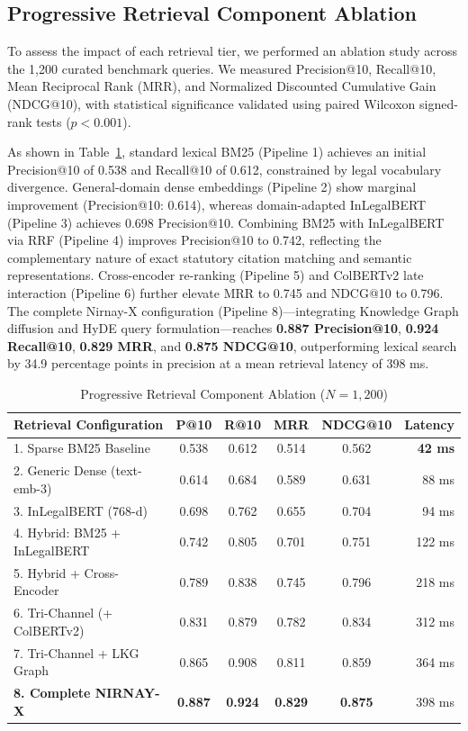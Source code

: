 \documentclass[conference]{IEEEtran}
\begin{document}
\subsection{Progressive Retrieval Component Ablation}
To assess the impact of each retrieval tier, we performed an ablation study across the 1,200 curated benchmark queries. We measured Precision@10, Recall@10, Mean Reciprocal Rank (MRR), and Normalized Discounted Cumulative Gain (NDCG@10), with statistical significance validated using paired Wilcoxon signed-rank tests ($p < 0.001$).

As shown in Table~\ref{tab:retrieval_ablation}, standard lexical BM25 (Pipeline 1) achieves an initial Precision@10 of 0.538 and Recall@10 of 0.612, constrained by legal vocabulary divergence. General-domain dense embeddings (Pipeline 2) show marginal improvement (Precision@10: 0.614), whereas domain-adapted InLegalBERT (Pipeline 3) achieves 0.698 Precision@10. Combining BM25 with InLegalBERT via RRF (Pipeline 4) improves Precision@10 to 0.742, reflecting the complementary nature of exact statutory citation matching and semantic representations. Cross-encoder re-ranking (Pipeline 5) and ColBERTv2 late interaction (Pipeline 6) further elevate MRR to 0.745 and NDCG@10 to 0.796. The complete Nirnay-X configuration (Pipeline 8)---integrating Knowledge Graph diffusion and HyDE query formulation---reaches \textbf{0.887 Precision@10}, \textbf{0.924 Recall@10}, \textbf{0.829 MRR}, and \textbf{0.875 NDCG@10}, outperforming lexical search by 34.9 percentage points in precision at a mean retrieval latency of 398 ms.

\begin{table}[!t]
\caption{Progressive Retrieval Component Ablation ($N=1,200$)}
\label{tab:retrieval_ablation}
\centering
\small
\begin{tabularx}{\columnwidth}{lccccr}
\toprule
\textbf{Retrieval Configuration} & \textbf{P@10} & \textbf{R@10} & \textbf{MRR} & \textbf{NDCG@10} & \textbf{Latency} \\
\midrule
1. Sparse BM25 Baseline & 0.538 & 0.612 & 0.514 & 0.562 & \textbf{42 ms} \\
2. Generic Dense (text-emb-3) & 0.614 & 0.684 & 0.589 & 0.631 & 88 ms \\
3. InLegalBERT (768-d) & 0.698 & 0.762 & 0.655 & 0.704 & 94 ms \\
4. Hybrid: BM25 + InLegalBERT & 0.742 & 0.805 & 0.701 & 0.751 & 122 ms \\
5. Hybrid + Cross-Encoder & 0.789 & 0.838 & 0.745 & 0.796 & 218 ms \\
6. Tri-Channel (+ ColBERTv2) & 0.831 & 0.879 & 0.782 & 0.834 & 312 ms \\
7. Tri-Channel + LKG Graph & 0.865 & 0.908 & 0.811 & 0.859 & 364 ms \\
\midrule
\textbf{8. Complete NIRNAY-X} & \textbf{0.887} & \textbf{0.924} & \textbf{0.829} & \textbf{0.875} & 398 ms \\
\bottomrule
\end{tabularx}
\end{table}
\end{document}
